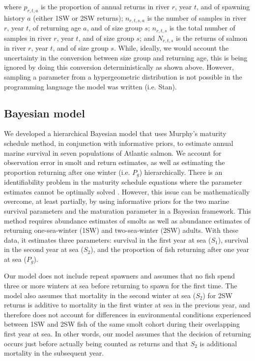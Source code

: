 \documentclass[12pt]{article}
\newcommand{\So}{$S_{1}$\xspace}
\newcommand{\St}{$S_{2}$\xspace}
\newcommand{\Pg}{$P_g$\xspace}
\begin{document}
where $p_{r,t,a}$ is the proportion of annual returns in river $r$, year $t$,
and of spawning history $a$ (either 1SW or 2SW returns); $n_{r,t,s,a}$ is the
number of samples in river $r$, year $t$, of returning age $a$, and of size
group $s$; $n_{r,t,s}$ is the total number of samples in river $r$, year $t$,
and of size group $s$; and $N_{r,t,s}$ is the returns of salmon
in river $r$, year $t$, and of size group $s$.
While, ideally, we would account the uncertainty in the conversion between
size group and returning age, this is being ignored by doing this conversion
deterministically as shown above. However, sampling a parameter from a
hypergeometric distribution is not possible in the programming language the model was
written (i.e. Stan).

\subsection*{Bayesian model}

We developed a hierarchical Bayesian model that uses Murphy's maturity
schedule method, in conjunction with informative priors, to estimate annual
marine survival in seven populations of Atlantic salmon. We account for
observation error in smolt and return estimates, as well as estimating the
proportion returning after one winter (i.e. \Pg) hierarchically.
There is an identifiability problem in the maturity schedule equations where
the parameter estimates cannot be optimally solved \citep{Chaput2003a}.
However, this issue can be mathematically overcome, at least partially, by
using informative priors for the two marine survival parameters and the maturation
parameter in a Bayesian framework.
This method requires abundance estimates of smolts as well as abundance estimates
of returning one-sea-winter (1SW) and two-sea-winter (2SW) adults. With these data,
it estimates three parameters: survival in the first year at sea (\So), survival
in the second year at sea (\St), and the proportion of fish returning after one
year at sea (\Pg). 

Our model does not include repeat spawners and assumes that no fish spend
three or more winters at sea before returning to spawn for the first time.
The model also assumes that mortality in the second winter at sea (\St) for 2SW returns
is additive to mortality in the first winter at sea in the previous year, 
and therefore does not account for differences in environmental conditions experienced
between 1SW and 2SW fish of the same smolt cohort during their overlapping first year at sea.
In other words, our model assumes that the decision of returning occurs just before
actually being counted as returns and that \St is additional mortality in
the subsequent year. 
\end{document}
